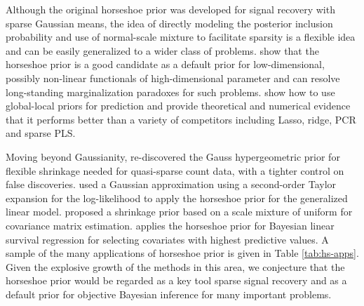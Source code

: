 \documentclass[sts,preprint]{imsart}
\begin{document}
Although the original horseshoe prior was developed for signal recovery with sparse Gaussian means, the idea of directly modeling the posterior inclusion probability and use of normal-scale mixture to facilitate sparsity is a flexible idea and can be easily generalized to a wider class of problems. \citet{bhadra2015default} show that the horseshoe prior is a good candidate as a default prior for low-dimensional, possibly non-linear functionals of high-dimensional parameter and can resolve long-standing marginalization paradoxes for such problems. \citet{bhadra2016prediction} show how to use global-local priors for prediction and provide theoretical and numerical evidence that it performs better than a variety of competitors including Lasso, ridge, PCR and sparse PLS. 

Moving beyond Gaussianity, \citet{datta2016bayesian} re-discovered the Gauss hypergeometric prior for flexible shrinkage needed for quasi-sparse count data, with a tighter control on false discoveries.
\citet{piironen2016hyperprior} used a Gaussian approximation using a second-order Taylor expansion for the log-likelihood to apply the horseshoe prior for the generalized linear model. \citet{wang2013class} proposed a shrinkage prior based on a scale mixture of uniform for covariance matrix estimation. \citet{peltola2014hierarchical} applies the horseshoe prior for Bayesian linear survival regression for selecting covariates with highest predictive values. A sample of the many applications of horseshoe prior is given in Table \ref{tab:hs-apps}. Given the explosive growth of the methods in
this area, we conjecture that the horseshoe prior would be regarded as a key tool sparse signal recovery and as a default prior for objective Bayesian inference for many important problems. 
\end{document}
